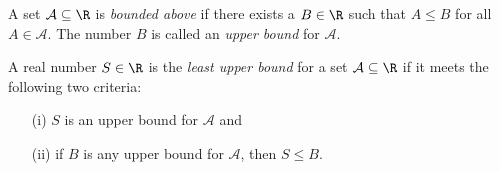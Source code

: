 \begin{definition}
    A set \( \mathcal{A} \subseteq \R  \) is \textit{bounded above} if there exists a \( B \in \R  \) such that \( A \leq B  \) for all \( A \in \mathcal{A}  \). The number \( B  \) is called an \textit{upper bound} for \( \mathcal{A} \). 

    A real number \( S \in \R  \) is the \textit{least upper bound} for a set \( \mathcal{A} \subseteq \R  \) if it meets the following two criteria:
    \begin{enumerate}
        \item[(i)] \( S  \) is an upper bound for \( \mathcal{A}  \) and
        \item[(ii)] if \( B  \) is any upper bound for \( \mathcal{A}  \), then \( S \leq B  \).
    \end{enumerate}
\end{definition}


